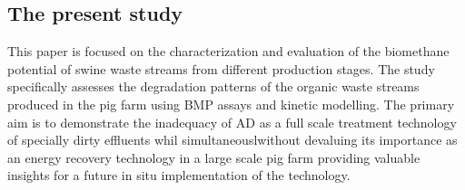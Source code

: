 \subsection{The present study}
This paper is focused on the characterization and evaluation of the biomethane potential of swine waste streams from different production stages. The study specifically assesses the degradation patterns of the organic waste streams produced in the pig farm using BMP assays and kinetic modelling. The primary aim is to demonstrate the inadequacy of AD as a full scale treatment technology of specially dirty effluents whil simultaneouslwithout devaluing its importance as an energy recovery technology in a large scale pig farm providing valuable insights for a future in situ implementation of the technology.